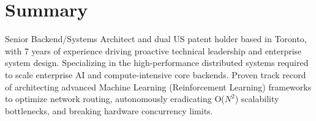 \section{Summary}
Senior Backend/Systems Architect and dual US patent holder based in Toronto, with 7 years of experience driving proactive technical leadership and enterprise system design. Specializing in the high-performance distributed systems required to scale enterprise AI and compute-intensive core backends. Proven track record of architecting advanced Machine Learning (Reinforcement Learning) frameworks to optimize network routing, autonomously eradicating O($N^2$) scalability bottlenecks, and breaking hardware concurrency limits.
